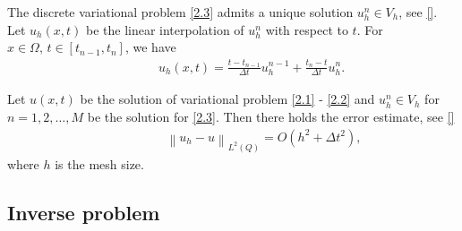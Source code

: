 \documentclass[notitlepage,a4paper,fleqn,9pt]{icmfarticle}
\begin{document}
\begin{multicols}{2}
The discrete variational problem \eqref{2.3} admits a unique solution $u^n_h\in V_h$, see \eqref{}. Let $u_h(x, t)$ be the linear interpolation of $u_h^n$ with respect to $t$. 
For $x\in \Omega,\, t\in [t_{n-1}, t_n]$, we have
\begin{align*}
	\qquad\quad u_h(x, t)=\frac{t-t_{n-1}}{\Delta t}u_h^{n-1}+\frac{t_n-t}{\Delta t}u_h^{n}.
\end{align*}
\begin{dl}\label{dl2.1}
	Let $u(x, t)$ be the solution of variational problem \eqref{2.1} - \eqref{2.2} and $u^n_h\in V_h$ for $n=1, 2, \dots, M$ be the solution for \eqref{2.3}. Then there holds the error estimate, see \eqref{}
	\begin{align}\label{2.5}
		\qquad\qquad\quad\left\|u_h-u\right\|_{L^2(Q)}=O\left(h^2+\Delta t^2\right),
	\end{align}
	where $h$ is the mesh size.
\end{dl}

\subsection{Inverse problem}


\end{multicols}
\end{document}
